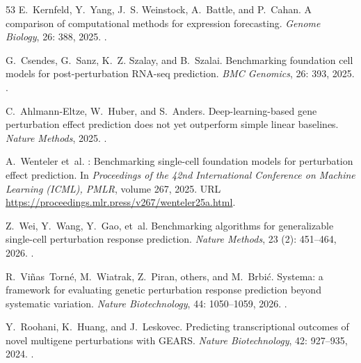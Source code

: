 \documentclass[fleqn,10pt,lineno]{wlpeerj}  %
\begin{document}
\begin{thebibliography}{53}
E.~Kernfeld, Y.~Yang, J.~S. Weinstock, A.~Battle, and P.~Cahan.
\newblock A comparison of computational methods for expression forecasting.
\newblock \emph{Genome Biology}, 26: 388, 2025.
\newblock {}.

G.~Csendes, G.~Sanz, K.~Z. Szalay, and B.~Szalai.
\newblock Benchmarking foundation cell models for post-perturbation {RNA}-seq
  prediction.
\newblock \emph{BMC Genomics}, 26: 393, 2025.
\newblock {}.

C.~Ahlmann-Eltze, W.~Huber, and S.~Anders.
\newblock Deep-learning-based gene perturbation effect prediction does not yet
  outperform simple linear baselines.
\newblock \emph{Nature Methods}, 2025.
\newblock {}.

A.~Wenteler et~al.
: Benchmarking single-cell foundation models for
  perturbation effect prediction.
\newblock In \emph{Proceedings of the 42nd International Conference on Machine
  Learning (ICML), PMLR}, volume 267, 2025.
\newblock URL \url{https://proceedings.mlr.press/v267/wenteler25a.html}.

Z.~Wei, Y.~Wang, Y.~Gao, et~al.
\newblock Benchmarking algorithms for generalizable single-cell perturbation
  response prediction.
\newblock \emph{Nature Methods}, 23 (2): 451--464, 2026.
\newblock {}.

R.~Vi{\~n}as~Torn{\'e}, M.~Wiatrak, Z.~Piran, others, and M.~Brbi{\'c}.
\newblock Systema: a framework for evaluating genetic perturbation response
  prediction beyond systematic variation.
\newblock \emph{Nature Biotechnology}, 44: 1050--1059, 2026.
\newblock {}.

Y.~Roohani, K.~Huang, and J.~Leskovec.
\newblock Predicting transcriptional outcomes of novel multigene perturbations
  with {GEARS}.
\newblock \emph{Nature Biotechnology}, 42: 927--935, 2024.
\newblock {}.


\end{thebibliography}
\end{document}
